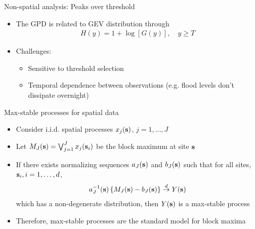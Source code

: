 \documentclass{beamer}
\begin{document}
\begin{frame}{Non-spatial analysis: Peaks over threshold}
  \begin{itemize} \setlength{\itemsep}{1em}
    \item The GPD is related to GEV distribution through
    \begin{align*}
      H(y) = 1 + \log[G(y)], \quad y \ge T
    \end{align*}
    \item Challenges: \vspace{0.5em}
    \begin{itemize} \setlength{\itemsep}{0.5em}
      \item Sensitive to threshold selection
      \item Temporal dependence between observations (e.g. flood levels don't dissipate overnight)
    \end{itemize}
  \end{itemize}
\end{frame}


\begin{frame}{Max-stable processes for spatial data}
  \begin{itemize} \setlength{\itemsep}{1em}
    \item Consider i.i.d. spatial processes $x_j(\mbox{\bf s})$, $j = 1, \ldots, J$
    \item Let $M_J(\mbox{\bf s}) = \bigvee_{j=1}^J x_j(\mbox{\bf s}_i)$ be the block maximum at site $\mbox{\bf s}$
    \item If there exists normalizing sequences $a_J(\mbox{\bf s})$ and $b_J(\mbox{\bf s})$ such that for all sites, $\mbox{\bf s}_i, i = 1, \ldots, d$,
    \begin{align*}
      a_J^{-1}(\mbox{\bf s}) \left\{ M_J(\mbox{\bf s}) - b_J(\mbox{\bf s}) \right\} \stackrel{d}{\rightarrow} Y(\mbox{\bf s})
    \end{align*}
    which has a non-degenerate distribution, then $Y(\mbox{\bf s})$ is a max-stable process
    \item Therefore, max-stable processes are the standard model for block maxima
  \end{itemize}
\end{frame}
\end{document}

